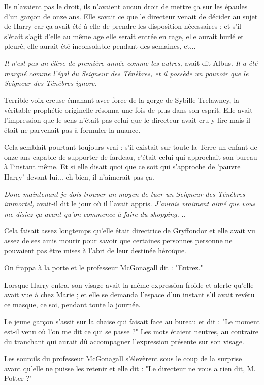 Ils n'avaient pas le droit, ils n'avaient aucun droit de mettre ça sur les épaules d'un garçon de onze ans. Elle savait ce que le directeur venait de décider au sujet de Harry car ça avait été à elle de prendre les disposition nécessaires ; et s'il s'était s'agit d'elle au même age elle serait entrée en rage, elle aurait hurlé et pleuré, elle aurait été inconsolable pendant des semaines, et...

\emph{Il n'est pas un élève de première année comme les autres,}  avait dit Albus. \emph{Il a été marqué comme l'égal du Seigneur des Ténèbres, et il possède un pouvoir que le Seigneur des Ténèbres ignore.} 

Terrible voix creuse émanant avec force de la gorge de Sybille Trelawney, la véritable prophétie originelle résonna une fois de plus dans son esprit. Elle avait l'impression que le sens n'était pas celui que le directeur avait cru y lire mais il était ne parvenait pas à formuler la nuance.

Cela semblait pourtant toujours vrai : s'il existait sur toute la Terre un enfant de onze ans capable de supporter de fardeau, c'était celui qui approchait son bureau à l'instant même. Et si elle disait quoi que ce soit qui s'approche de 'pauvre Harry' devant lui... eh bien, il n'aimerait pas ça.

\emph{Donc maintenant je dois trouver un moyen de tuer un Seigneur des Ténèbres immortel,}  avait-il dit le jour où il l'avait appris. \emph{J'aurais vraiment aimé que vous me disiez ça avant qu'on commence à faire du shopping.} ..

Cela faisait assez longtemps qu'elle était directrice de Gryffondor et elle avait vu assez de ses amis mourir pour savoir que certaines personnes personne ne pouvaient pas être mises à l'abri de leur destinée héroïque.

On frappa à la porte et le professeur McGonagall dit : "Entrez."

Lorsque Harry entra, son visage avait la même expression froide et alerte qu'elle avait vue à chez Marie ; et elle se demanda l'espace d'un instant s'il avait revêtu ce masque, ce soi, pendant toute la journée.

Le jeune garçon s'assit sur la chaise qui faisait face au bureau et dit : "Le moment est-il venu où l'on me dit ce qui se passe ?" Les mots étaient neutres, au contraire du tranchant qui aurait dû accompagner l'expression présente sur son visage.

Les sourcils du professeur McGonagall s'élevèrent sous le coup de la surprise avant qu'elle ne puisse les retenir et elle dit : "Le directeur ne vous a rien dit, M. Potter ?"

